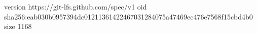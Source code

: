version https://git-lfs.github.com/spec/v1
oid sha256:eab030b0957394dc01211361422467031284075a47469ec476e7568f15cbd4b0
size 1168
